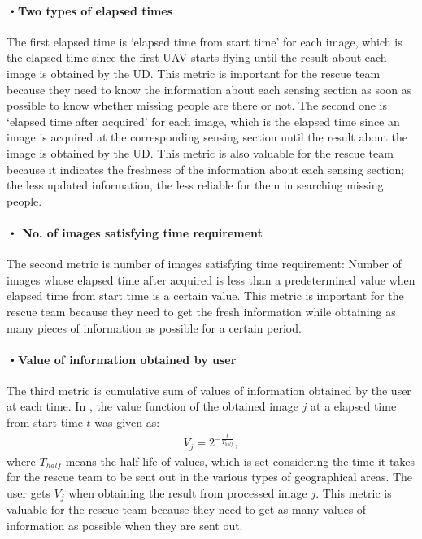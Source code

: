 \documentclass{ieeeaccess}
\begin{document}
\paragraph*{・Two types of elapsed times}
The first elapsed time is `elapsed time from start time' for each image, which is the elapsed time since the first UAV starts flying until the result about each image is obtained by the UD.
%
This metric is important for the rescue team because they need to know the information about each sensing section as soon as possible to know whether missing people are there or not.
%
The second one is `elapsed time after acquired' for each image, which is the elapsed time since an image is acquired at the corresponding sensing section until the result about the image is obtained by the UD.
%
This metric is also valuable for the rescue team because it indicates the freshness of the information about each sensing section; the less updated information, the less reliable for them in searching missing people.

\paragraph*{・ No. of images satisfying time requirement}
The second metric is number of images satisfying time requirement: Number of images whose elapsed time after acquired is less than a predetermined value when elapsed time from start time is a certain value.
This metric is important for the rescue team because they need to get the fresh information while obtaining as many pieces of information as possible for a certain period.

\paragraph*{・Value of information obtained by user}
The third metric is cumulative sum of values of information obtained by the user at each time.
In \cite{NOMURA2001}, the value function of the obtained image $j$ at a elapsed time from start time $t$ was given as:
\begin{align}
V_j=2^{-\frac{t}{T_{half}}}, \label{eq_value}
\end{align}
where $T_{half}$ means the half-life of values, which is set considering the time it takes for the rescue team to be sent out in the various types of geographical areas. 
The user gets $V_j$ when obtaining the result from processed image $j$. 
This metric is valuable for the rescue team because they need to get as many values of information as possible when they are sent out.
\end{document}
